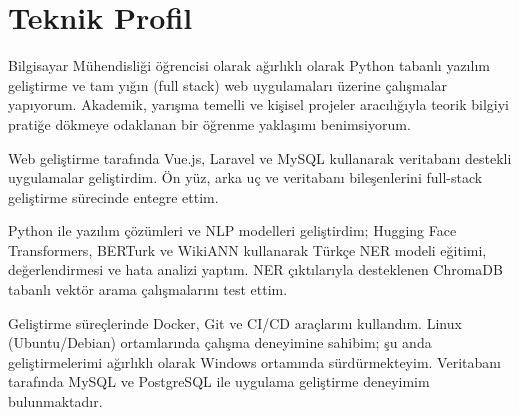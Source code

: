 \section*{Teknik Profil}

Bilgisayar Mühendisliği öğrencisi olarak ağırlıklı olarak Python tabanlı yazılım geliştirme ve tam yığın (full stack) web uygulamaları üzerine çalışmalar yapıyorum. Akademik, yarışma temelli ve kişisel projeler aracılığıyla teorik bilgiyi pratiğe dökmeye odaklanan bir öğrenme yaklaşımı benimsiyorum.

\vspace{0.2cm}

Web geliştirme tarafında Vue.js, Laravel ve MySQL kullanarak veritabanı destekli uygulamalar geliştirdim. Ön yüz, arka uç ve veritabanı bileşenlerini full-stack geliştirme sürecinde entegre ettim.

\vspace{0.2cm}

Python ile yazılım çözümleri ve NLP modelleri geliştirdim; Hugging Face Transformers, BERTurk ve WikiANN kullanarak Türkçe NER modeli eğitimi, değerlendirmesi ve hata analizi yaptım. NER çıktılarıyla desteklenen ChromaDB tabanlı vektör arama çalışmalarını test ettim.

\vspace{0.2cm}

Geliştirme süreçlerinde Docker, Git ve CI/CD araçlarını kullandım. Linux (Ubuntu/Debian) ortamlarında çalışma deneyimine sahibim; şu anda geliştirmelerimi ağırlıklı olarak Windows ortamında sürdürmekteyim. Veritabanı tarafında MySQL ve PostgreSQL ile uygulama geliştirme deneyimim bulunmaktadır.
